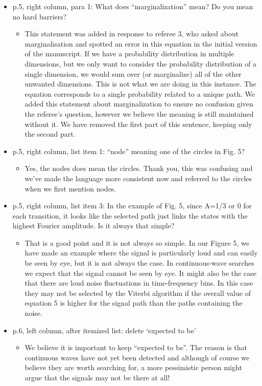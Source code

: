 \documentclass[a4paper, 10pt]{letter}
\begin{document}
\begin{itemize}
\item p.5, right column, para 1: What does ``marginalization'' mean? Do you mean no hard barriers?
\begin{itemize}
\item This statement was added in response to referee 3, who asked about marginalisation and spotted an error in this equation in the initial version of the manuscript. If we have a probability distribution in multiple dimensions, but we only want to consider the probability distribution of a single dimension, we would sum over (or marginalize) all of the other unwanted dimensions. This is not what we are doing in this instance. The equation corresponds to a single probability related to a unique path. We added this statement about marginalization to ensure no confusion given the referee's question, however we believe the meaning is still maintained without it. We have removed the first part of this sentence, keeping only the second part. 
\end{itemize}

\item p.5, right column, list item 1: ``node'' meaning one of the circles in Fig. 5? 
\begin{itemize}
\item Yes, the nodes does mean the circles. Thank you, this was confusing and we've made the language more consistent now and referred to the circles when we first mention nodes.
\end{itemize}

\item p.5, right column, list item 3: In the example of Fig. 5, since A=1/3 or 0 for each transition, it looks like the selected path just links the states with the highest Fourier amplitude. Is it always that simple?
\begin{itemize}
\item That is a good point and it is not always so simple. In our Figure 5, we have made an example where the signal is particularly loud and can easily be seen by eye, but it is not always the case. In continuous-wave searches we expect that the signal cannot be seen by eye. It might also be the case that there are loud noise fluctuations in time-frequency bins. In this case they may not be selected by the Viterbi algorithm if the overall value of equation 5 is higher for the signal path than the paths containing the noise. 
\end{itemize}

\item p.6, left column, after itemized list: delete `expected to be' 
\begin{itemize}
\item We believe it is important to keep ``expected to be''. The reason is that continuous waves have not yet been detected and although of course we believe they are worth searching for, a more pessimistic person might argue that the signals may not be there at all! 
\end{itemize}


\end{itemize}
\end{document}
